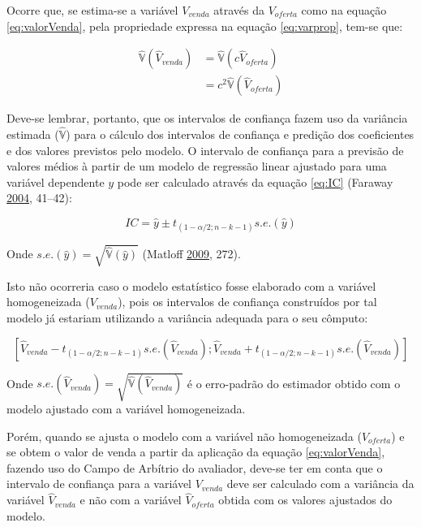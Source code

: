 \documentclass{article}
\begin{document}
Ocorre que, se estima-se a variável \(V_{venda}\) através da
\(V_{oferta}\) como na equação \ref{eq:valorVenda}, pela propriedade
expressa na equação \ref{eq:varprop}, tem-se que:

\begin{align}
\label{eq:varianciaVenda}
\hat{\mathbb{V}}(\hat V_{venda}) &= \hat{\mathbb{V}}(c \hat V_{oferta}) \\ 
&= c^2 \hat{\mathbb{V}}(\hat V_{oferta})
\end{align}

Deve-se lembrar, portanto, que os intervalos de confiança fazem uso da
variância estimada (\(\hat{\mathbb{V}}\)) para o cálculo dos intervalos
de confiança e predição dos coeficientes e dos valores previstos pelo
modelo. O intervalo de confiança para a previsão de valores médios à
partir de um modelo de regressão linear ajustado para uma variável
dependente \(y\) pode ser calculado através da equação \ref{eq:IC}
(Faraway \protect\hyperlink{ref-faraway2004linear}{2004}, 41--42):

\begin{equation}
\label{eq:IC}
IC = \hat y \pm t_{(1-\alpha/2; n-k-1)} s.e.(\hat y)
\end{equation}

Onde \(s.e.(\hat y) = \sqrt{\hat{\mathbb{V}} (\hat y)}\) (Matloff
\protect\hyperlink{ref-matloff2009}{2009}, 272).

Isto não ocorreria caso o modelo estatístico fosse elaborado com a
variável homogeneizada (\(V_{venda}\)), pois os intervalos de confiança
construídos por tal modelo já estariam utilizando a variância adequada
para o seu cômputo:

\begin{equation}
\label{eq:ICVenda}
[\hat V_{venda} - t_{(1-\alpha/2; n-k-1)} s.e.(\hat V_{venda}) ;
 \hat V_{venda} + t_{(1-\alpha/2; n-k-1)} s.e.(\hat V_{venda}) ]
\end{equation}

Onde \(s.e.(\hat V_{venda}) = \sqrt{\hat{\mathbb{V}} (\hat V_{venda})}\)
é o erro-padrão do estimador obtido com o modelo ajustado com a variável
homogeneizada.

Porém, quando se ajusta o modelo com a variável não homogeneizada
(\(V_{oferta}\)) e se obtem o valor de venda a partir da aplicação da
equação \ref{eq:valorVenda}, fazendo uso do Campo de Arbítrio do
avaliador, deve-se ter em conta que o intervalo de confiança para a
variável \(V_{venda}\) deve ser calculado com a variância da variável
\(\hat V_{venda}\) e não com a variável \(\hat V_{oferta}\) obtida com
os valores ajustados do modelo.
\end{document}
